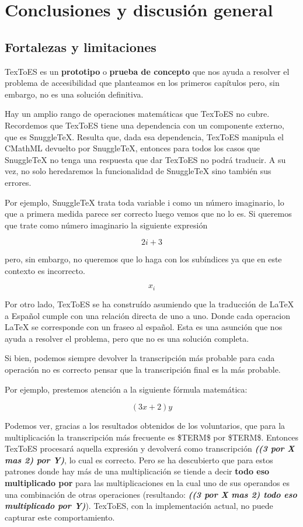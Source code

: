 \chapter{Conclusiones y discusión general}

\label{Chapter5}

\section{Fortalezas y limitaciones}
TexToES es un \textbf{prototipo} o \textbf{prueba de concepto} que nos ayuda a resolver el problema de accesibilidad que planteamos en los primeros capítulos pero, sin embargo, no es una solución definitiva.

Hay un amplio rango de operaciones matemáticas que TexToES no cubre. Recordemos que TexToES tiene una dependencia con un componente externo, que es SnuggleTeX. Resulta que, dada esa dependencia, TexToES manipula el CMathML devuelto por SnuggleTeX, entonces para todos los casos que SnuggleTeX no tenga una respuesta que dar TexToES no podrá traducir. A su vez, no solo heredaremos la funcionalidad de SnuggleTeX sino también sus errores.

Por ejemplo, SnuggleTeX trata toda variable i como un número imaginario, lo que a primera medida parece ser correcto luego vemos que no lo es. Si queremos que trate como número imaginario la siguiente expresión

$$2i + 3$$

pero, sin embargo, no queremos que lo haga con los subíndices ya que en este contexto es incorrecto.

$$x_i$$

Por otro lado, TexToES se ha construído asumiendo que la traducción de LaTeX a Español cumple con una relación directa de uno a uno. Donde cada operacion LaTeX se corresponde con un fraseo al español. Esta es una asunción que nos ayuda a resolver el problema, pero que no es una solución completa.

Si bien, podemos siempre devolver la transcripción más probable para cada operación no es correcto pensar que la transcripción final es la más probable.

Por ejemplo, prestemos atención a la siguiente fórmula matemática:

$$ (3x + 2) y $$

Podemos ver, gracias a los resultados obtenidos de los voluntarios, que para la multiplicación la transcripción más frecuente es \$TERM\$ por \$TERM\$. Entonces TexToES procesará aquella expresión y devolverá como transcripción \textbf{\textit{((3 por X mas 2) por Y)}}, lo cual es correcto. Pero se ha descubierto que para estos patrones donde hay más de una multiplicación se tiende a decir \textbf{todo eso multiplicado por} para las multiplicaciones en la cual uno de sus operandos es una combinación de otras operaciones (resultando: \textbf{\textit{((3 por X mas 2) todo eso multiplicado por Y)}}). TexToES, con la implementación actual, no puede capturar este comportamiento.


